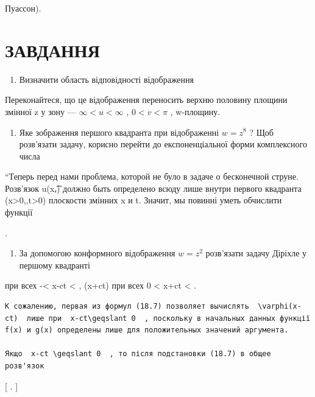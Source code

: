 \documentclass[
  ukrainian,
]{article}
\providecommand{\tightlist}{%
  \setlength{\itemsep}{0pt}\setlength{\parskip}{0pt}}
\begin{document}
Пуассон).

\section{ЗАВДАННЯ}\label{ux437ux430ux432ux434ux430ux43dux43dux44f-10}

\begin{enumerate}
\def\labelenumi{\arabic{enumi}.}
\tightlist
\item
  Визначити область відповідності відображення
\end{enumerate}

Переконайтеся, що це відображення переносить верхню половину площини
змінної z у зону --- \(\infty < u < \infty\) , \(0 < v < \pi\) ,
w-площину.

\begin{enumerate}
\def\labelenumi{\arabic{enumi}.}
\setcounter{enumi}{1}
\tightlist
\item
  Яке зображення першого квадранта при відображенні \(w=z^{8}\) ? Щоб
  розв'язати задачу, корисно перейти до експоненціальної форми
  комплексного числа
\end{enumerate}

``Теперь перед нами проблема, которой не було в задаче о бесконечной
струне. Розв'язок u\left(x,\t\right) должно быть определено всюду лише
внутри первого квадранта (x\textgreater0,,t\textgreater0) плоскости
змінних x и t. Значит, мы повинні уметь обчислити функції

.

\begin{enumerate}
\def\labelenumi{\arabic{enumi}.}
\setcounter{enumi}{2}
\tightlist
\item
  За допомогою конформного відображення \(w=z^2\) розв'язати задачу
  Діріхле у першому квадранті
\end{enumerate}

при всех -\infty \textless{} x-ct \textless{} \infty  , \psi(x+ct) при
всех 0 \textless{} x+ct \textless{} \infty  .

\begin{verbatim}
К сожалению, первая из формул (18.7) позволяет вычислять  \varphi(x-ct)  лише при  x-ct\geqslant 0  , поскольку в начальных данных функції f(x) и g(x) определены лише для положительных значений аргумента.

Якщо  x-ct \geqslant 0  , то після подстановки (18.7) в общее розв'язок
\end{verbatim}

{[} \right. {]}
\end{document}
